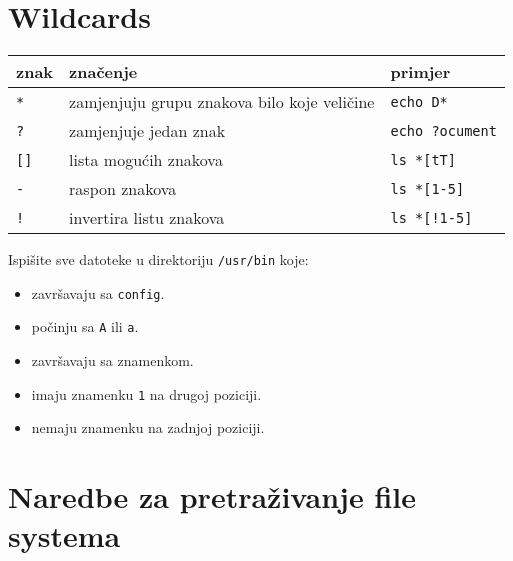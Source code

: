 \section{Wildcards}
\begin{center}
\begin{tabular}{lll}
\toprule
znak & značenje & primjer\\
\midrule
\texttt{*} & zamjenjuju grupu znakova bilo koje veličine& \texttt{echo D*}\\
\texttt{?} & zamjenjuje jedan znak&\texttt{echo ?ocument}\\
\texttt{[]} & lista mogućih znakova&\texttt{ls *[tT]}\\ 
\texttt{-} & raspon znakova &\texttt{ls *[1-5]}\\
\texttt{!} &invertira listu znakova&\texttt{ls *[!1-5]}\\
\bottomrule
\end{tabular}
\end{center}
\begin{zadatak} Ispišite sve datoteke u direktoriju \texttt{/usr/bin} koje:
\begin{itemize}
 \item završavaju sa \texttt{config}.
 \item počinju sa \texttt{A} ili \texttt{a}.
 \item završavaju sa znamenkom.
 \item imaju znamenku \texttt{1} na drugoj poziciji.
 \item nemaju znamenku na zadnjoj poziciji.
 \end{itemize}
\end{zadatak}

 \section{Naredbe za pretraživanje file systema}

